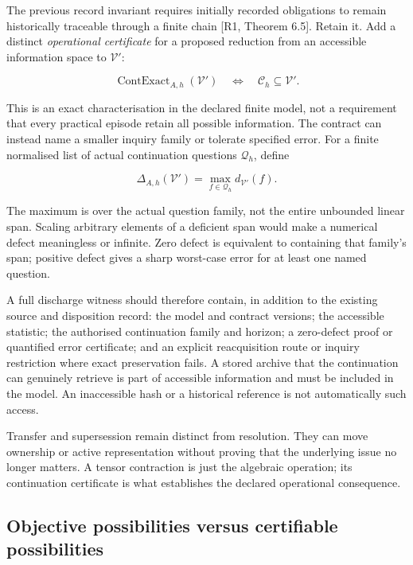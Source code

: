 \documentclass[11pt,a4paper]{article}
\begin{document}
The previous record invariant requires initially recorded obligations to
remain historically traceable through a finite chain {[}R1, Theorem
6.5{]}. Retain it. Add a distinct \emph{operational certificate} for a
proposed reduction from an accessible information space to
\(\mathscr V'\):

\nopagebreak[4]

\[
\operatorname{ContExact}_{A,h}(\mathscr V')
\quad\Longleftrightarrow\quad
\mathscr C_h\subseteq\mathscr V'.
\]

This is an exact characterisation in the declared finite model, not a
requirement that every practical episode retain all possible
information. The contract can instead name a smaller inquiry family or
tolerate specified error. For a finite normalised list of actual
continuation questions \(\mathscr Q_h\), define

\nopagebreak[4]

\[
\Delta_{A,h}(\mathscr V')
 =\max_{f\in\mathscr Q_h}d_{\mathscr V'}(f).
\]

The maximum is over the actual question family, not the entire unbounded
linear span. Scaling arbitrary elements of a deficient span would make a
numerical defect meaningless or infinite. Zero defect is equivalent to
containing that family's span; positive defect gives a sharp worst-case
error for at least one named question.

A full discharge witness should therefore contain, in addition to the
existing source and disposition record: the model and contract versions;
the accessible statistic; the authorised continuation family and
horizon; a zero-defect proof or quantified error certificate; and an
explicit reacquisition route or inquiry restriction where exact
preservation fails. A stored archive that the continuation can genuinely
retrieve is part of accessible information and must be included in the
model. An inaccessible hash or a historical reference is not
automatically such access.

Transfer and supersession remain distinct from resolution. They can move
ownership or active representation without proving that the underlying
issue no longer matters. A tensor contraction is just the algebraic
operation; its continuation certificate is what establishes the declared
operational consequence.

\subsection{Objective possibilities versus certifiable
possibilities}\label{objective-possibilities-versus-certifiable-possibilities}
\end{document}
